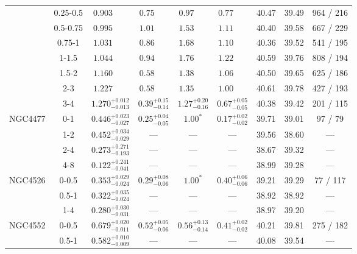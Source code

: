 \documentclass[structabstract]{aa}
\begin{document}
{{\begin{longtable}{lcccccccc}
 & 0.25-0.5 & $ 0.903~~~~~~~~ $ & $  0.75~~~~~~~ $ & $  0.97~~~~~~~ $ & $  0.77~~~~~~~ $ &  40.47 &  39.49&   964 /   216 \\
 & 0.5-0.75 & $ 0.995~~~~~~~~ $ & $  1.01~~~~~~~ $ & $  1.53~~~~~~~ $ & $  1.11~~~~~~~ $ &  40.40 & 39.58 &   667 /   229 \\
 & 0.75-1 & $ 1.031~~~~~~~~ $ & $  0.86~~~~~~~ $ & $  1.68~~~~~~~ $ & $  1.10~~~~~~~ $ &  40.36 &   39.52 &   541 /   195 \\
 & 1-1.5 & $ 1.044~~~~~~~~ $ & $  0.94~~~~~~~ $ & $  1.76~~~~~~~ $ & $  1.22~~~~~~~ $ &  40.59 &  39.76 &   808 /   194 \\
 & 1.5-2 & $ 1.160~~~~~~~~ $ & $  0.58~~~~~~~ $ & $  1.38~~~~~~~ $ & $  1.06~~~~~~~ $ &  40.50 &  39.65 &   625 /   186 \\
 & 2-3 & $ 1.227~~~~~~~~ $ & $  0.58~~~~~~~ $ & $  1.35~~~~~~~ $ & $  1.00~~~~~~~ $ &  40.61 &  39.78 &   427 /   193 \\
 & 3-4 & $ 1.270 _{- 0.013 }^{+ 0.012 } $ & $  0.39 _{-  0.14 }^{+  0.15 } $ & $  1.27 _{-  0.16 }^{+  0.20 } $ & $  0.67 _{-  0.05 }^{+  0.05 } $ &  40.38 & 39.42 &   201 /   115 \\
\hline
NGC4477 & 0-1 & $ 0.446 _{- 0.027 }^{+ 0.023 } $ & $  0.25 _{-  0.05 }^{+  0.04 } $ & $ 1.00^{\ast} $ & $  0.17 _{-  0.02 }^{+  0.02 } $ &  39.71 & 39.01 &    97 /    79 \\
 & 1-2 & $ 0.452 _{- 0.029 }^{+ 0.034 } $ & --- & --- & --- &  39.56 & 38.60 & --- \\
 & 2-4 & $ 0.273 _{- 0.193 }^{+ 0.271 } $ & --- & --- & --- &  38.67 & 39.32 & --- \\
 & 4-8 & $ 0.122 _{- 0.041 }^{+ 0.241 } $ & --- & --- & --- &  38.99 & 39.28 & --- \\
\hline
NGC4526 & 0-0.5 & $ 0.353 _{- 0.024 }^{+ 0.029 } $ & $  0.29 _{-  0.06 }^{+  0.08 } $ & $ 1.00^{\ast} $ & $  0.40 _{-  0.06 }^{+  0.06 } $ &  39.21 & 39.29 &    77 /   117 \\
 & 0.5-1 & $ 0.322 _{- 0.024 }^{+ 0.035 } $ & --- & --- & --- &  38.92 & 38.92 & --- \\
 & 1-4 & $ 0.280 _{- 0.031 }^{+ 0.030 } $ & --- & --- & --- &  38.97 & 39.20& --- \\
\hline
NGC4552 & 0-0.5 & $ 0.679 _{- 0.011 }^{+ 0.020 } $ & $  0.52 _{-  0.06 }^{+  0.05 } $ & $  0.56 _{-  0.14 }^{+  0.13 } $ & $  0.41 _{-  0.02 }^{+  0.02 } $ &  40.21 & 39.81 &   275 /   182 \\
 & 0.5-1 & $ 0.582 _{- 0.009 }^{+ 0.010 } $ & --- & --- & --- &  40.08 & 39.54 & --- \\

\end{longtable}}}
\end{document}
